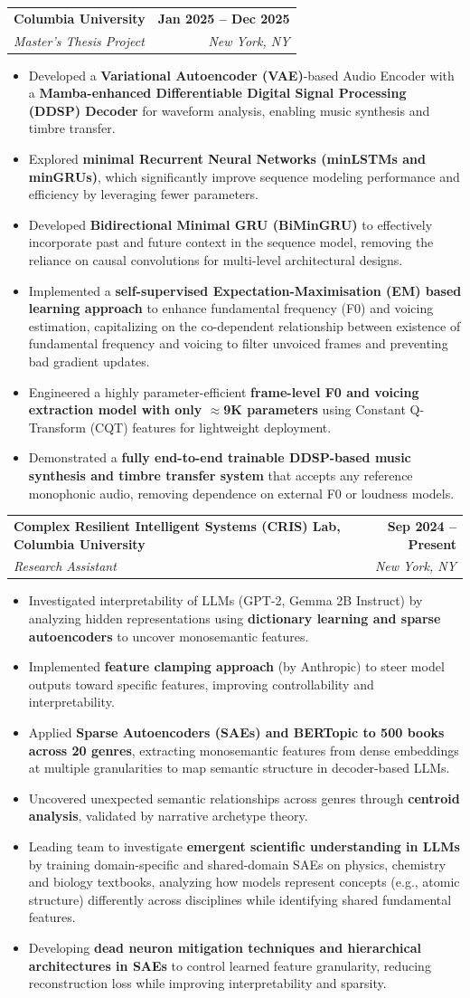 \documentclass[letterpaper,11pt]{article}
\makeatletter
\newcommand{\resumeItem}[1]{
  \item\small{
    {#1 \vspace{-2pt}}
  }
}
\newcommand{\resumeSubheading}[4]{
  \vspace{-2pt}\item
    \begin{tabular*}{1.0\textwidth}[t]{l@{\extracolsep{\fill}}r}
      \textbf{#1} & \textbf{\small #2} \\
      \textit{\small#3} & \textit{\small #4} \\
    \end{tabular*}\vspace{-7pt}
}
\newcommand{\resumeItemListStart}{\begin{itemize}}
\newcommand{\resumeItemListEnd}{\end{itemize}\vspace{-5pt}}
\makeatother
\begin{document}
\resumeSubheading
{Columbia University}{Jan 2025 -- Dec 2025}
{Master's Thesis Project}{New York, NY}
\resumeItemListStart
\resumeItem{Developed a \textbf{Variational Autoencoder (VAE)}-based Audio Encoder with a \textbf{Mamba-enhanced Differentiable Digital Signal Processing (DDSP) Decoder} for waveform analysis, enabling music synthesis and timbre transfer.}
\resumeItem{Explored \textbf{minimal Recurrent Neural Networks (minLSTMs and minGRUs)}, which significantly improve sequence modeling performance and efficiency by leveraging fewer parameters.}
\resumeItem{Developed \textbf{Bidirectional Minimal GRU (BiMinGRU)} to effectively incorporate past and future context in the sequence model, removing the reliance on causal convolutions for multi-level architectural designs.}
\resumeItem{Implemented a \textbf{self-supervised Expectation-Maximisation (EM) based learning approach} to enhance fundamental frequency (F0) and voicing estimation, capitalizing on the co-dependent relationship between existence of fundamental frequency and voicing to filter unvoiced frames and preventing bad gradient updates.}
\resumeItem{Engineered a highly parameter-efficient \textbf{frame-level F0 and voicing extraction model with only $\approx$9K parameters} using Constant Q-Transform (CQT) features for lightweight deployment.}
\resumeItem{Demonstrated a \textbf{fully end-to-end trainable DDSP-based music synthesis and timbre transfer system} that accepts any reference monophonic audio, removing dependence on external F0 or loudness models.}
\resumeItemListEnd

\resumeSubheading
{Complex Resilient Intelligent Systems (CRIS) Lab, Columbia University}{Sep 2024 -- Present}
{Research Assistant}{New York, NY}
\resumeItemListStart
\resumeItem{Investigated interpretability of LLMs (GPT-2, Gemma 2B Instruct) by analyzing hidden representations using \textbf{dictionary learning and sparse autoencoders} to uncover monosemantic features.}
\resumeItem{Implemented \textbf{feature clamping approach} (by Anthropic) to steer model outputs toward specific features, improving controllability and interpretability.}
\resumeItem{Applied \textbf{Sparse Autoencoders (SAEs) and BERTopic to 500 books across 20 genres}, extracting monosemantic features from dense embeddings at multiple granularities to map semantic structure in decoder-based LLMs.}
\resumeItem{Uncovered unexpected semantic relationships across genres through \textbf{centroid analysis}, validated by narrative archetype theory.}
\resumeItem{Leading team to investigate \textbf{emergent scientific understanding in LLMs} by training domain-specific and shared-domain SAEs on physics, chemistry and biology textbooks, analyzing how models represent concepts (e.g., atomic structure) differently across disciplines while identifying shared fundamental features.}
\resumeItem{Developing \textbf{dead neuron mitigation techniques and hierarchical architectures in SAEs} to control learned feature granularity, reducing reconstruction loss while improving interpretability and sparsity.}
\resumeItemListEnd
\end{document}
